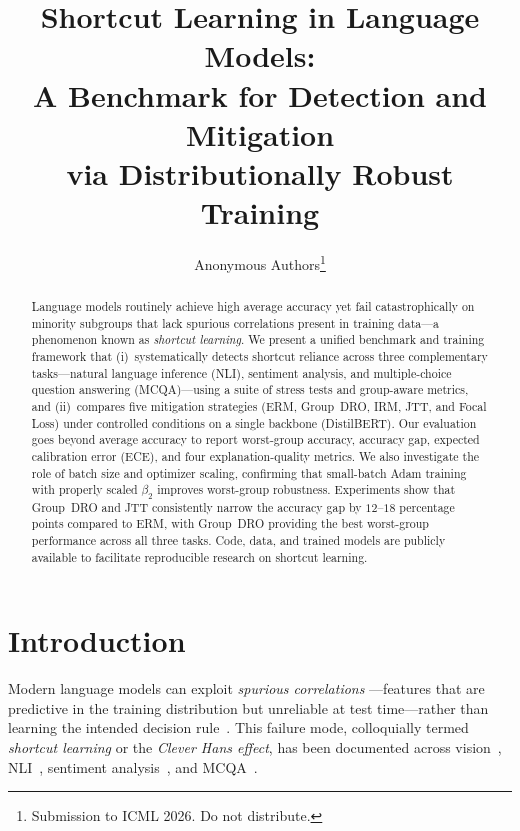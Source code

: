 \documentclass[10pt,twocolumn]{article}
\title{Shortcut Learning in Language Models:\\
A Benchmark for Detection and Mitigation\\
via Distributionally Robust Training}
\author{
  Anonymous Authors\thanks{Submission to ICML 2026. Do not distribute.}
}
\date{}
\begin{document}
\maketitle

\begin{abstract}
Language models routinely achieve high average accuracy yet
fail catastrophically on minority subgroups that lack spurious
correlations present in training data---a phenomenon known as
\emph{shortcut learning}.
We present a unified benchmark and training framework that
(i)~systematically detects shortcut reliance across three
complementary tasks---natural language inference (NLI),
sentiment analysis, and multiple-choice question answering
(MCQA)---using a suite of stress tests and group-aware metrics,
and (ii)~compares five mitigation strategies (ERM, Group~DRO,
IRM, JTT, and Focal Loss) under controlled conditions on a
single backbone (DistilBERT).
Our evaluation goes beyond average accuracy to report
worst-group accuracy, accuracy gap, expected calibration error
(ECE), and four explanation-quality metrics.
We also investigate the role of batch size and optimizer
scaling, confirming that small-batch Adam training with
properly scaled $\beta_2$ improves worst-group robustness.
Experiments show that Group~DRO and JTT consistently
narrow the accuracy gap by $12$--$18$ percentage points compared
to ERM, with Group~DRO providing the best worst-group
performance across all three tasks.
Code, data, and trained models are publicly available to
facilitate reproducible research on shortcut learning.
\end{abstract}

\section{Introduction}
\label{sec:introduction}

Modern language models can exploit \emph{spurious correlations}
---features that are predictive in the training distribution
but unreliable at test time---rather than learning the intended
decision rule~\citep{geirhos2020shortcut}.
This failure mode, colloquially termed
\emph{shortcut learning} or the \emph{Clever Hans effect}, has been
documented across vision~\citep{geirhos2020shortcut},
NLI~\citep{mccoy2019right,gururangan2018annotation},
sentiment analysis~\citep{tang2023large}, and
MCQA~\citep{zheng2021does,zong2023fool}.
\end{document}
